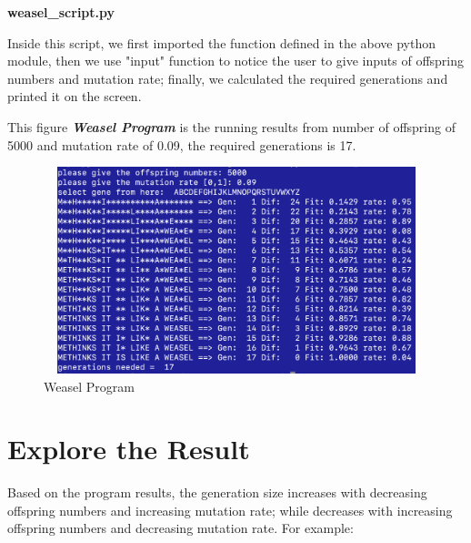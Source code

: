 \documentclass[12pt, letterpaper]{article} %
\begin{document}
 \textbf{weasel\_script.py} 
 
 Inside this script, we first imported the function defined in the above python module, then we use "input" function to notice the 
 user to give inputs of offspring numbers and mutation rate; finally, we calculated the required generations and printed it on the screen.

\graphicspath{ {./images/} } %
This figure \textit{\textbf{Weasel Program}} is the running results from number of offspring of 5000 and mutation rate of 0.09,
the required generations is 17.

\begin{figure}[!t] %
\begin{center} %
  \includegraphics[width=12cm,height=6cm]{running_result.png} %
  \caption{Weasel Program} %
  \label{png:running_result} %
\end{center} %
\end{figure} %

\section{Explore the Result} %

Based on the program results, the generation size increases with decreasing offspring numbers and increasing mutation rate; 
while decreases with increasing offspring numbers and decreasing mutation rate. For example:
\end{document}
